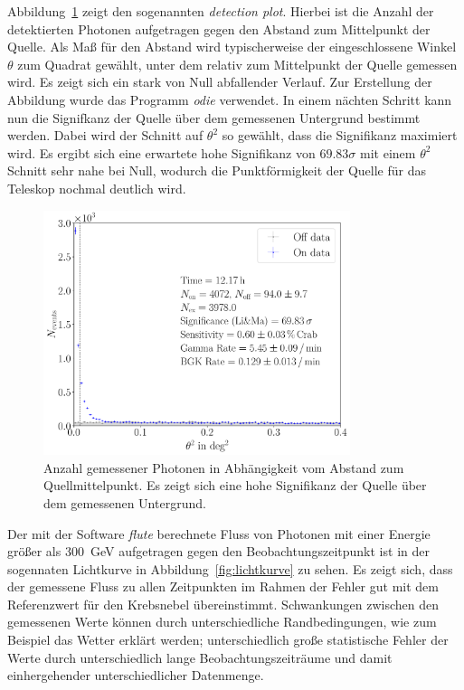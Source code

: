Abbildung~\ref{fig:detectionplot} zeigt den sogenannten \textit{detection plot}.
Hierbei ist die Anzahl der detektierten Photonen aufgetragen gegen den Abstand
zum Mittelpunkt der Quelle. Als Maß für den Abstand wird typischerweise
der eingeschlossene Winkel $\theta$ zum Quadrat gewählt, unter dem relativ zum
Mittelpunkt der Quelle gemessen wird. Es zeigt sich ein stark von Null
abfallender Verlauf. Zur Erstellung der Abbildung wurde das Programm
\textit{odie} verwendet. In einem nächten Schritt kann nun die Signifkanz der
Quelle über dem gemessenen Untergrund bestimmt werden. Dabei wird der Schnitt
auf $\theta^2$ so gewählt, dass die Signifikanz maximiert wird. Es ergibt sich
eine erwartete hohe Signifikanz von $\num{69.83}\sigma$ mit einem $\theta^2$
Schnitt sehr nahe bei Null, wodurch die Punktförmigkeit der Quelle für das
Teleskop nochmal deutlich wird.

\begin{figure}
  \centering
  \includegraphics[width=0.8\textwidth]{figures/odie_thetasquared.pdf}
  \caption{Anzahl gemessener Photonen in Abhängigkeit vom Abstand zum
  Quellmittelpunkt. Es zeigt sich eine hohe Signifikanz der Quelle über dem
  gemessenen Untergrund.}
  \label{fig:detectionplot}
\end{figure}

Der mit der Software \textit{flute} berechnete Fluss von Photonen mit einer
Energie größer als \SI{300}{\giga\electronvolt} aufgetragen gegen den
Beobachtungszeitpunkt ist in der sogennaten Lichtkurve in
Abbildung~\ref{fig:lichtkurve} zu sehen. Es zeigt sich, dass der gemessene Fluss
zu allen Zeitpunkten im Rahmen der Fehler gut mit dem Referenzwert für den
Krebsnebel übereinstimmt. Schwankungen zwischen den gemessenen Werte können
durch unterschiedliche Randbedingungen, wie zum Beispiel das Wetter erklärt
werden; unterschiedlich große statistische Fehler der Werte durch
unterschiedlich lange Beobachtungszeiträume und damit einhergehender
unterschiedlicher Datenmenge.

